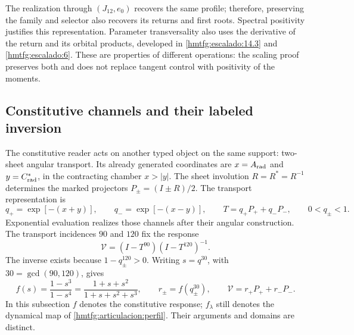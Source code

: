 The realization through \((J_{12},e_0)\) recovers the same profile;
therefore, preserving the family and selector also recovers
its returns and first roots. Spectral positivity
justifies this representation. Parameter transversality
also uses the derivative of the return and its orbital products,
developed in \ref{hmtfg:escalado:14.3} and
\ref{hmtfg:escalado:6}. These are properties of different operations:
the scaling proof preserves both and does not replace
tangent control with positivity of the moments.

\subsection{Constitutive channels and their labeled inversion}
\label{hmtfg:articulacion:constitutiva}

The constitutive reader acts on another typed object on the same
support: two-sheet angular transport. Its already generated
coordinates are \(x=A_{\rm rad}\) and \(y=C^*_{\rm rad}\), in the
contracting chamber \(x>|y|\). The sheet involution
\(R=R^*=R^{-1}\) determines the marked projectors
\(P_\pm=(I\pm R)/2\). The transport representation is
\begin{equation}
 q_+=\exp[-(x+y)],\qquad q_-=\exp[-(x-y)],\qquad
 T=q_+P_++q_-P_-,\qquad 0<q_\pm<1.
 \label{hmtfg:articulacion:canales}
\end{equation}
Exponential evaluation realizes those channels after their
angular construction. The transport incidences \(90\) and \(120\)
fix the response
\[
 \mathcal V=(I-T^{90})(I-T^{120})^{-1}.
\]
The inverse exists because \(1-q_\pm^{120}>0\).
Writing \(s=q^{30}\), with \(30=\gcd(90,120)\), gives
\begin{equation}
 f(s)=\frac{1-s^3}{1-s^4}
     =\frac{1+s+s^2}{1+s+s^2+s^3},\qquad
 r_\pm=f(q_\pm^{30}),\qquad
 \mathcal V=r_+P_++r_-P_-.
 \label{hmtfg:articulacion:respuesta}
\end{equation}
In this subsection \(f\) denotes the constitutive response;
\(f_\lambda\) still denotes the dynamical map of
\eqref{hmtfg:articulacion:perfil}. Their arguments and domains
are distinct.


